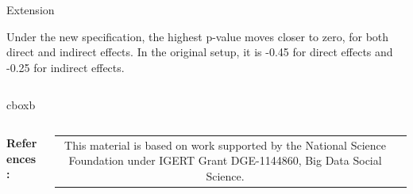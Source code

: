 \documentclass[final]{beamer}
\newlength{\onecolwid}
\newlength{\onecolwidd}
\begin{document}
\begin{frame}[t]
\begin{columns}[t]
\begin{column}{\onecolwidd}
\begin{block}{Extension}
\begin{rmfamily}
	\hspace{2cm}
	Under the new specification, the highest p-value moves closer to zero, for both direct and indirect effects. In the original setup, it is -0.45 for direct effects and -0.25 for indirect effects.
		
	\end{rmfamily}						
	\end{block}

	\end{column}	
	\end{columns}
	
	

			
	\hspace*{.5in} \begin{beamercolorbox}[wd=50.75in,colsep=0.1cm]{cboxb}\end{beamercolorbox}
	
	\begin{columns}
	
		\begin{column}{0.3\paperwidth}	
			\begin{rmfamily}
				\small
					\def\newblock{}
				\textbf{References:} \\

	
			\end{rmfamily}
			
			\vspace{0.5in}		
		\end{column}
		
		
		\begin{column}{0.3\paperwidth}
	\centering
		\begin{tabular}{cc}

 \begin{minipage}{8.5in}
This material is based on work supported by the National Science Foundation under IGERT Grant DGE-1144860, Big Data Social Science.


\end{minipage}


\end{tabular}
\end{column}
\end{columns}
\end{frame}
\end{document}
